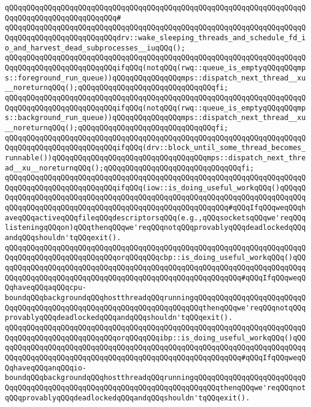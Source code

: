 \verb|qQQqqQQqqQQqqQQqqQQqqQQqqQQqqQQqqQQqqQQqqQQqqQQqqQQqqQQqqQQqqQQqqQQqqQQqqQQqqQQqqQQqqQQqqQQqqQQq#|\newline
\verb|qQQqqQQqqQQqqQQqqQQqqQQqqQQqqQQqqQQqqQQqqQQqqQQqqQQqqQQqqQQqqQQqqQQqqQQqqQQqqQQqqQQqqQQqqQQqqQQqdrv::wake_sleeping_threads_and_schedule_fd_io_and_harvest_dead_subprocesses__iuqQQq();|\newline
\newline
\verb|qQQqqQQqqQQqqQQqqQQqqQQqqQQqqQQqqQQqqQQqqQQqqQQqqQQqqQQqqQQqqQQqqQQqqQQqqQQqqQQqqQQqqQQqqQQqqQQqifqQQq(notqQQq(rwq::queue_is_emptyqQQqqQQqmps::foreground_run_queue))qQQqqQQqqQQqqQQqmps::dispatch_next_thread__xu__noreturnqQQq();qQQqqQQqqQQqqQQqqQQqqQQqqQQqqQQqfi;|\newline
\verb|qQQqqQQqqQQqqQQqqQQqqQQqqQQqqQQqqQQqqQQqqQQqqQQqqQQqqQQqqQQqqQQqqQQqqQQqqQQqqQQqqQQqqQQqqQQqqQQqifqQQq(notqQQq(rwq::queue_is_emptyqQQqqQQqmps::background_run_queue))qQQqqQQqqQQqqQQqmps::dispatch_next_thread__xu__noreturnqQQq();qQQqqQQqqQQqqQQqqQQqqQQqqQQqqQQqfi;|\newline
\verb|qQQqqQQqqQQqqQQqqQQqqQQqqQQqqQQqqQQqqQQqqQQqqQQqqQQqqQQqqQQqqQQqqQQqqQQqqQQqqQQqqQQqqQQqqQQqqQQqifqQQq(drv::block_until_some_thread_becomes_runnable())qQQqqQQqqQQqqQQqqQQqqQQqqQQqqQQqqQQqmps::dispatch_next_thread__xu__noreturnqQQq();qQQqqQQqqQQqqQQqqQQqqQQqqQQqqQQqfi;|\newline
\newline
\verb|qQQqqQQqqQQqqQQqqQQqqQQqqQQqqQQqqQQqqQQqqQQqqQQqqQQqqQQqqQQqqQQqqQQqqQQqqQQqqQQqqQQqqQQqqQQqqQQqifqQQq(iow::is_doing_useful_workqQQq()qQQqqQQqqQQqqQQqqQQqqQQqqQQqqQQqqQQqqQQqqQQqqQQqqQQqqQQqqQQqqQQqqQQqqQQqqQQqqQQqqQQqqQQqqQQqqQQqqQQqqQQqqQQqqQQqqQQqqQQqqQQqqQQq#qQQqIfqQQqweqQQqhaveqQQqactiveqQQqfileqQQqdescriptorsqQQq(e.g.,qQQqsocketsqQQqwe'reqQQqlisteningqQQqon)qQQqthenqQQqwe'reqQQqnotqQQqprovablyqQQqdeadlockedqQQqandqQQqshouldn'tqQQqexit().|\newline
\verb|qQQqqQQqqQQqqQQqqQQqqQQqqQQqqQQqqQQqqQQqqQQqqQQqqQQqqQQqqQQqqQQqqQQqqQQqqQQqqQQqqQQqqQQqqQQqqQQqorqQQqqQQqcbp::is_doing_useful_workqQQq()qQQqqQQqqQQqqQQqqQQqqQQqqQQqqQQqqQQqqQQqqQQqqQQqqQQqqQQqqQQqqQQqqQQqqQQqqQQqqQQqqQQqqQQqqQQqqQQqqQQqqQQqqQQqqQQqqQQqqQQqqQQqqQQq#qQQqIfqQQqweqQQqhaveqQQqaqQQqcpu-boundqQQqbackgroundqQQqhostthreadqQQqrunningqQQqqQQqqQQqqQQqqQQqqQQqqQQqqQQqqQQqqQQqqQQqqQQqqQQqqQQqqQQqqQQqqQQqqQQqthenqQQqwe'reqQQqnotqQQqprovablyqQQqdeadlockedqQQqandqQQqshouldn'tqQQqexit().|\newline
\verb|qQQqqQQqqQQqqQQqqQQqqQQqqQQqqQQqqQQqqQQqqQQqqQQqqQQqqQQqqQQqqQQqqQQqqQQqqQQqqQQqqQQqqQQqqQQqqQQqorqQQqqQQqibp::is_doing_useful_workqQQq()qQQqqQQqqQQqqQQqqQQqqQQqqQQqqQQqqQQqqQQqqQQqqQQqqQQqqQQqqQQqqQQqqQQqqQQqqQQqqQQqqQQqqQQqqQQqqQQqqQQqqQQqqQQqqQQqqQQqqQQqqQQqqQQq#qQQqIfqQQqweqQQqhaveqQQqanqQQqio-boundqQQqbackgroundqQQqhostthreadqQQqrunningqQQqqQQqqQQqqQQqqQQqqQQqqQQqqQQqqQQqqQQqqQQqqQQqqQQqqQQqqQQqqQQqqQQqqQQqqQQqthenqQQqwe'reqQQqnotqQQqprovablyqQQqdeadlockedqQQqandqQQqshouldn'tqQQqexit().|\newline
